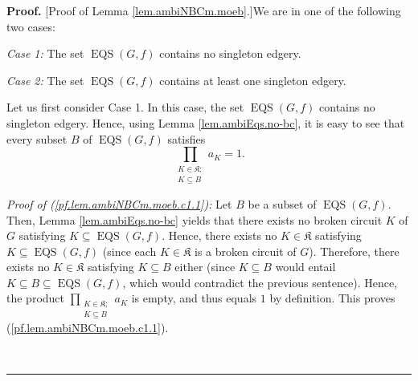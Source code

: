 \documentclass[numbers=enddot,12pt,final,onecolumn,notitlepage]{scrartcl}%
\theoremstyle{definition}
\newenvironment{proof}[1][Proof]{\noindent\textbf{#1.} }{\ \rule{0.5em}{0.5em}}
\newenvironment{vershort}{}{}
\let\prodnonlimits\prod
\renewcommand{\prod}{\prodnonlimits\limits}
\begin{document}
\begin{proof}
[Proof of Lemma \ref{lem.ambiNBCm.moeb}.]We are in one of the following two cases:

\textit{Case 1:} The set $\operatorname*{EQS}\left(  G,f\right)  $ contains no
singleton edgery.

\textit{Case 2:} The set $\operatorname*{EQS}\left(  G,f\right)  $ contains at
least one singleton edgery.

Let us first consider Case 1. In this case, the set $\operatorname*{EQS}%
\left(  G,f\right)  $ contains no singleton edgery. Hence, using Lemma
\ref{lem.ambiEqs.no-bc}, it is easy to see that every subset $B$ of
$\operatorname*{EQS}\left(  G,f\right)  $ satisfies%
\begin{equation}
\prod_{\substack{K\in\mathfrak{K};\\K\subseteq B}}a_{K}=1.
\label{pf.lem.ambiNBCm.moeb.c1.1}%
\end{equation}


\begin{vershort}
\textit{Proof of (\ref{pf.lem.ambiNBCm.moeb.c1.1}):} Let $B$ be a subset of
$\operatorname*{EQS}\left(  G,f\right)  $. Then, Lemma \ref{lem.ambiEqs.no-bc}
yields that there exists no broken circuit $K$ of $G$ satisfying
$K\subseteq\operatorname*{EQS}\left(  G,f\right)  $. Hence, there exists no
$K\in\mathfrak{K}$ satisfying $K\subseteq\operatorname*{EQS}\left(
G,f\right)  $ (since each $K\in\mathfrak{K}$ is a broken circuit of $G$).
Therefore, there exists no $K\in\mathfrak{K}$ satisfying $K\subseteq B$ either
(since $K\subseteq B$ would entail $K\subseteq B\subseteq\operatorname*{EQS}%
\left(  G,f\right)  $, which would contradict the previous sentence). Hence,
the product $\prod_{\substack{K\in\mathfrak{K};\\K\subseteq B}}a_{K}$ is
empty, and thus equals $1$ by definition. This proves
(\ref{pf.lem.ambiNBCm.moeb.c1.1}).
\end{vershort}


\end{proof}
\end{document}
